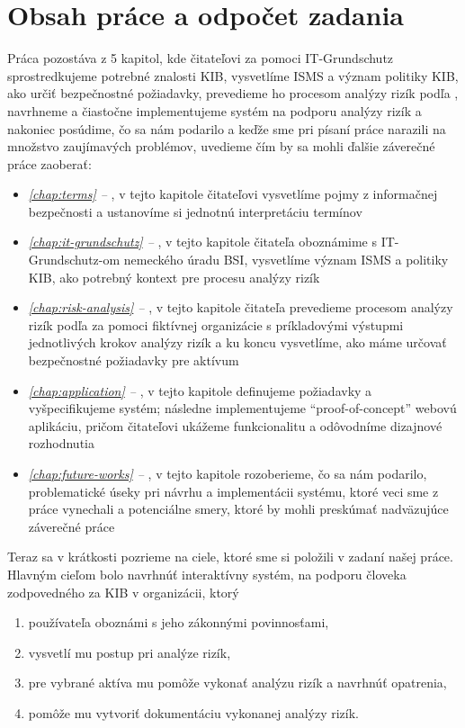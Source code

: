 \section*{Obsah práce a odpočet zadania}
Práca pozostáva z 5 kapitol, kde čitateľovi za pomoci IT-Grundschutz sprostredkujeme potrebné znalosti KIB, vysvetlíme ISMS a
význam politiky KIB, ako určiť bezpečnostné požiadavky, prevedieme ho procesom analýzy rizík podľa \cite{BSI3}, navrhneme a čiastočne
implementujeme systém na podporu analýzy rizík a nakoniec posúdime, čo sa nám podarilo a keďže sme pri písaní práce narazili na množstvo
zaujímavých problémov, uvedieme čím by sa mohli ďalšie záverečné práce zaoberať:
\begin{itemize}[nosep]
    \item \emph{\ref{chap:terms} -- }, v tejto kapitole čitateľovi vysvetlíme pojmy z informačnej bezpečnosti a ustanovíme si jednotnú
    interpretáciu termínov
    \item \emph{\ref{chap:it-grundschutz} -- }, v tejto kapitole čitateľa oboznámime s IT-Grundschutz-om nemeckého úradu BSI,
    vysvetlíme význam ISMS a politiky KIB, ako potrebný kontext pre procesu analýzy rizík
    \item \emph{\ref{chap:risk-analysis} -- }, v tejto kapitole čitateľa prevedieme procesom analýzy rizík podľa \cite{BSI3} za pomoci
    fiktívnej organizácie s príkladovými výstupmi jednotlivých krokov analýzy rizík a ku koncu vysvetlíme, ako máme určovať
    bezpečnostné požiadavky pre aktívum
    \item \emph{\ref{chap:application} -- }, v tejto kapitole definujeme požiadavky a vyšpecifikujeme systém; následne implementujeme \enquote{proof-of-concept}
    webovú aplikáciu, pričom čitateľovi ukážeme funkcionalitu a odôvodníme dizajnové rozhodnutia 
    \item \emph{\ref{chap:future-works} -- }, v tejto kapitole rozoberieme, čo sa nám podarilo, problematické úseky pri návrhu a implementácii systému,
    ktoré veci sme z práce vynechali a potenciálne smery, ktoré by mohli preskúmať nadväzujúce záverečné práce
\end{itemize}

Teraz sa v krátkosti pozrieme na ciele, ktoré sme si položili v zadaní našej práce. Hlavným cieľom bolo navrhnúť interaktívny systém, na
podporu človeka zodpovedného za KIB v organizácii, ktorý
\begin{enumerate}[nosep,label=\alph*)]
    \item \label{goal:leg} používateľa oboznámi s jeho zákonnými povinnosťami,
    \item \label{goal:expl} vysvetlí mu postup pri analýze rizík,
    \item \label{goal:ra} pre vybrané aktíva mu pomôže vykonať analýzu rizík a navrhnúť opatrenia,
    \item \label{goal:doc} pomôže mu vytvoriť dokumentáciu vykonanej analýzy rizík.
\end{enumerate}

